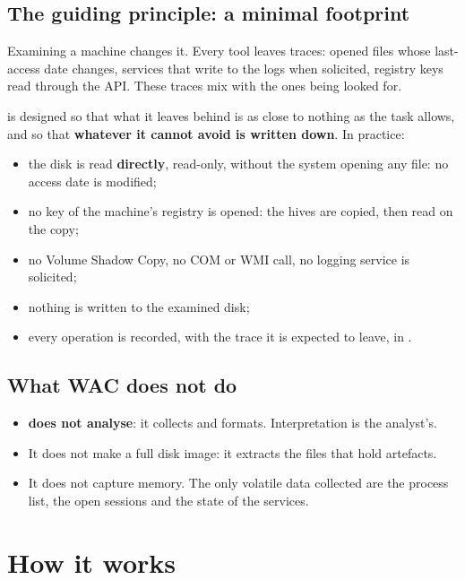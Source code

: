 \documentclass[11pt,a4paper,oneside]{report}
\begin{document}
\section{The guiding principle: a minimal footprint}

Examining a machine changes it. Every tool leaves traces: opened files whose
last-access date changes, services that write to the logs when solicited,
registry keys read through the API. These traces mix with the ones being looked
for.

\wac{} is designed so that what it leaves behind is as close to nothing as the
task allows, and so that \textbf{whatever it cannot avoid is written down}.
In practice:

\begin{itemize}
  \item the disk is read \textbf{directly}, read-only, without the system
        opening any file: no access date is modified;
  \item no key of the machine's registry is opened: the hives are copied, then
        read on the copy;
  \item no Volume Shadow Copy, no COM or WMI call, no logging service is
        solicited;
  \item nothing is written to the examined disk;
  \item every operation is recorded, with the trace it is expected to leave, in
        .
\end{itemize}

\section{What WAC does not do}

\begin{itemize}
  \item \wac{} \textbf{does not analyse}: it collects and formats. Interpretation
        is the analyst's.
  \item It does not make a full disk image: it extracts the files that hold
        artefacts.
  \item It does not capture memory. The only volatile data collected are the
        process list, the open sessions and the state of the services.
\end{itemize}

\chapter{How it works}
\end{document}
